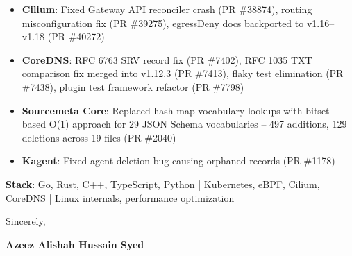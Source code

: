 \documentclass[10pt,letterpaper]{article}
\begin{document}
\begin{itemize}[nosep, leftmargin=*, topsep=2pt]
    \item \textbf{Cilium}: Fixed Gateway API reconciler crash (PR \#38874), routing misconfiguration fix (PR \#39275), egressDeny docs backported to v1.16--v1.18 (PR \#40272)
    \item \textbf{CoreDNS}: RFC 6763 SRV record fix (PR \#7402), RFC 1035 TXT comparison fix merged into v1.12.3 (PR \#7413), flaky test elimination (PR \#7438), plugin test framework refactor (PR \#7798)
    \item \textbf{Sourcemeta Core}: Replaced hash map vocabulary lookups with bitset-based O(1) approach for 29 JSON Schema vocabularies -- 497 additions, 129 deletions across 19 files (PR \#2040)
    \item \textbf{Kagent}: Fixed agent deletion bug causing orphaned records (PR \#1178)
\end{itemize}

\vspace{6pt}
\textbf{Stack}: Go, Rust, C++, TypeScript, Python | Kubernetes, eBPF, Cilium, CoreDNS | Linux internals, performance optimization

\vspace{12pt}

\noindent Sincerely,

\noindent\textbf{Azeez Alishah Hussain Syed}
\end{document}
